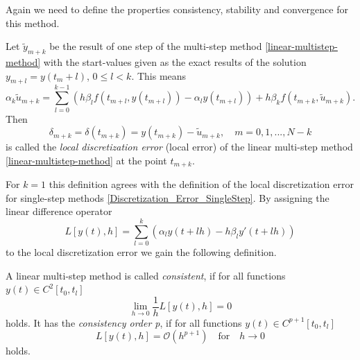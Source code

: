 	Again we need to define the properties consistency, stability and convergence for this method.
	\begin{definition}
		Let $\tilde{y}_{m+k}$ be the result of one step of the multi-step method \ref{linear-multistep-method} with the start-values given as the exact results of the solution $y_{m+l} = y(t_m+l)$, $0 \leq l < k$. This means
		\begin{displaymath}
			\alpha_k \tilde{u}_{m+k} = \sum_{l=0}^{k-1} \left( h \beta_l f(t_{m+l}, y(t_{m+l})) - \alpha_l y(t_{m+l}) \right) + h \beta_k f(t_{m+k}, \tilde{u}_{m+k}) .
		\end{displaymath}
		Then
		\begin{displaymath}
			\delta_{m+k} = \delta(t_{m+k}) = y(t_{m+k}) - \tilde{u}_{m+k}, \quad m=0,1,...,N-k
		\end{displaymath}
		is called the \emph{local discretization error} (local error) of the linear multi-step method \ref{linear-multistep-method} at the point $t_{m+k}$.
	\end{definition}
	
	For $k=1$ this definition agrees with the definition of the local discretization error for single-step methods \ref{Discretization_Error_SingleStep}.
	By assigning the linear difference operator
	\begin{equation}
		L[y(t),h] = \sum_{l=0}^{k} \left( \alpha_l y(t+lh) - h \beta_l y'(t+lh) \right)
	\end{equation}
	to the local discretization error we gain the following definition.

	\begin{definition}
		A linear multi-step method is called %
		\emph{consistent}, if for all functions $y(t) \in C^2[t_0,t_l]$
		\begin{displaymath}
			\lim\limits_{h \to 0} \frac{1}{h} L[y(t),h] = 0
		\end{displaymath}
		holds. It has the \emph{consistency order p}, if for all functions $y(t) \in C^{p+1}[t_0, t_l]$
		\begin{displaymath}
			L[y(t),h] = \mathcal{O}(h^{p+1}) \quad \text{for} \quad h \to 0
		\end{displaymath}
		holds.
	\end{definition}

